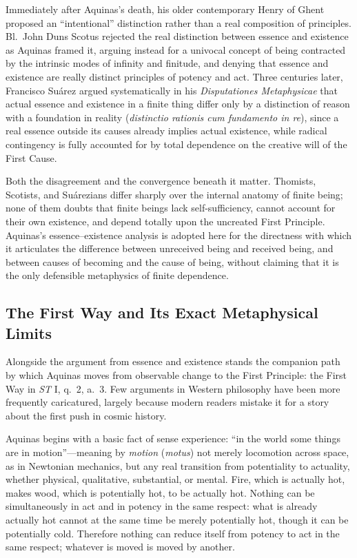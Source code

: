 Immediately after Aquinas's death, his older contemporary Henry of Ghent proposed an ``intentional'' distinction rather than a real composition of principles. Bl.\ John Duns Scotus rejected the real distinction between essence and existence as Aquinas framed it, arguing instead for a univocal concept of being contracted by the intrinsic modes of infinity and finitude, and denying that essence and existence are really distinct principles of potency and act. Three centuries later, Francisco Su\'{a}rez argued systematically in his \emph{Disputationes Metaphysicae} that actual essence and existence in a finite thing differ only by a distinction of reason with a foundation in reality (\emph{distinctio rationis cum fundamento in re}), since a real essence outside its causes already implies actual existence, while radical contingency is fully accounted for by total dependence on the creative will of the First Cause.

Both the disagreement and the convergence beneath it matter. Thomists, Scotists, and Su\'{a}rezians differ sharply over the internal anatomy of finite being; none of them doubts that finite beings lack self-sufficiency, cannot account for their own existence, and depend totally upon the uncreated First Principle. Aquinas's essence--existence analysis is adopted here for the directness with which it articulates the difference between unreceived being and received being, and between causes of becoming and the cause of being, without claiming that it is the only defensible metaphysics of finite dependence.

\subsection{The First Way and Its Exact Metaphysical Limits}

Alongside the argument from essence and existence stands the companion path by which Aquinas moves from observable change to the First Principle: the First Way in \emph{ST} I, q.\ 2, a.\ 3. Few arguments in Western philosophy have been more frequently caricatured, largely because modern readers mistake it for a story about the first push in cosmic history.

Aquinas begins with a basic fact of sense experience: ``in the world some things are in motion''---meaning by \emph{motion} (\emph{motus}) not merely locomotion across space, as in Newtonian mechanics, but any real transition from potentiality to actuality, whether physical, qualitative, substantial, or mental. Fire, which is actually hot, makes wood, which is potentially hot, to be actually hot. Nothing can be simultaneously in act and in potency in the same respect: what is already actually hot cannot at the same time be merely potentially hot, though it can be potentially cold. Therefore nothing can reduce itself from potency to act in the same respect; whatever is moved is moved by another.

